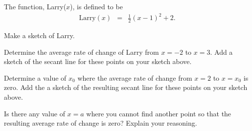 \begin{problem}
  \clearpage

\item The function, Larry($x$), is defined to be
  \begin{eqnarray*}
    \mathrm{Larry}(x) & = & \frac{1}{2} (x-1)^2+2.
  \end{eqnarray*}
  \begin{subproblem}
  \item Make a sketch of Larry.


  \item Determine the average rate of change of Larry from $x=-2$ to
    $x=3$. Add a sketch of the secant line for these points on your
    sketch above.

    \vfill

  \item Determine a value of $x_0$ where the average rate of change
    from $x=2$ to $x=x_0$ is zero. Add the a sketch of the resulting
    secant line for these points on your sketch above.

    \vfill

  \item Is there any value of $x=a$ where you cannot find another
    point so that the resulting average rate of change is zero?
    Explain your reasoning.

    \vspace{2em}


  \end{subproblem}

\end{problem}

